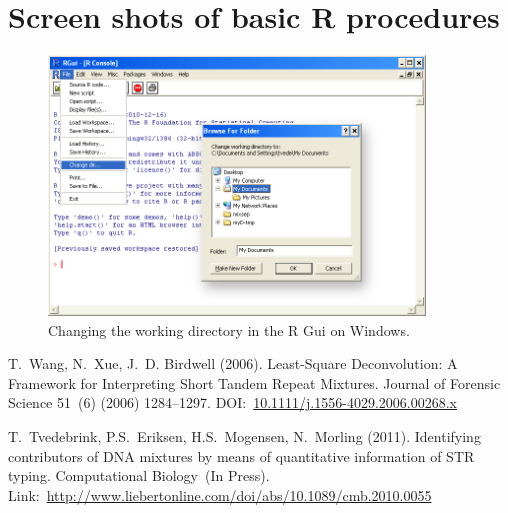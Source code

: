 \documentclass[a4paper,11pt]{article}
\begin{document}
\appendix

\section{Screen shots of basic R procedures}
\label{sec:basicR}

\begin{figure}[!h]
  \centering
  \includegraphics[width=10cm]{changedir}  
  \caption{\label{fig:changedir}Changing the working directory in the
    R Gui on Windows.}
\end{figure}

\begin{thebibliography}{}
  T.~Wang, N.~Xue, J.~D. Birdwell (2006).
  \newblock Least-Square Deconvolution: A Framework for Interpreting
  Short Tandem Repeat Mixtures.  
  \newblock Journal of Forensic Science
  51~(6) (2006) 1284--1297.
  \newblock DOI:~\href{http://dx.doi.org/10.1111/j.1556-4029.2006.00268.x}{10.1111/j.1556-4029.2006.00268.x}

  T.~Tvedebrink, P.S.~Eriksen, H.S.~Mogensen, N.~Morling (2011).
  \newblock Identifying contributors of DNA mixtures by means of
  quantitative information of STR typing.
  \newblock Computational Biology~(In Press).
  \newblock Link:~\href{http://www.liebertonline.com/doi/abs/10.1089/cmb.2010.0055}{http://www.liebertonline.com/doi/abs/10.1089/cmb.2010.0055}
\end{thebibliography}
\end{document}
